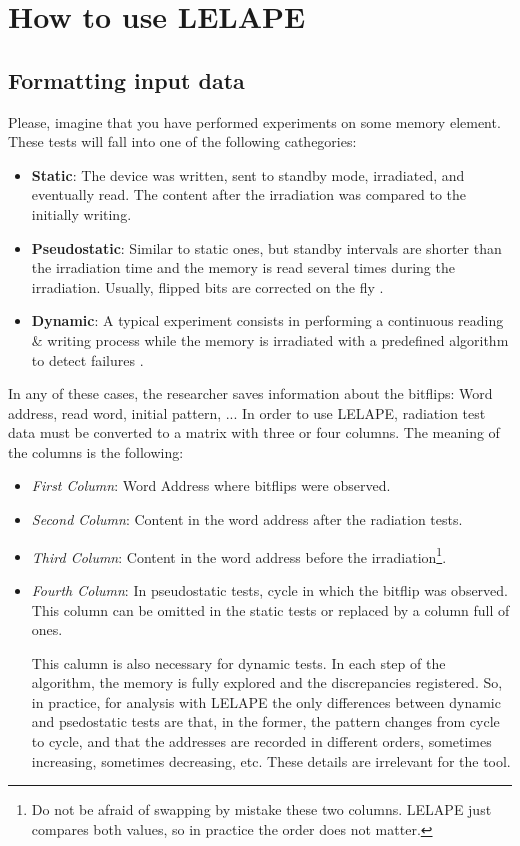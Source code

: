 \chapter{How to use LELAPE}
\section{Formatting input data}
%
Please, imagine that you have performed experiments on some memory element. These tests will fall into one of the following cathegories:
\begin{itemize}
	\item \textbf{Static}: The device was written, sent to standby mode, irradiated, and eventually read. The content after the irradiation was compared to the initially writing.
	\item \textbf{Pseudostatic}: Similar to static ones, but standby intervals are shorter than the irradiation time and the memory is read several times during the irradiation. Usually, flipped bits are corrected on the fly \cite{Gupta2017}.
	\item \textbf{Dynamic}: A typical experiment consists in performing a continuous reading \& writing process while the memory is irradiated with a predefined algorithm to detect failures \cite{Tsiligiannis2014a, Tsiligiannis2014b}. 
\end{itemize}

In any of these cases, the researcher saves information about the bitflips: Word address, read word, initial pattern, ... 
In order to use LELAPE, radiation test data must be converted to a matrix with three or four columns. The meaning of the columns is the following:
\begin{itemize}
	\item \textit{First Column}: Word Address where bitflips were observed.
	\item \textit{Second Column}: Content in the word address after the radiation tests.
	\item \textit{Third Column}: Content in the word address before the irradiation\footnote{Do not be afraid of swapping by mistake these two columns. LELAPE just compares both values, so in practice the order does not matter.}.
	\item \textit{Fourth Column}: In pseudostatic tests, cycle in which the bitflip was observed. This column can be omitted in the static tests or replaced by a column full of ones.  
	
	This calumn is also necessary for dynamic tests. In each step of the algorithm, the memory is fully explored and the discrepancies registered. So, in practice, for analysis with LELAPE the only differences between dynamic and psedostatic tests are that, in the former, the pattern changes from cycle to cycle, and that the addresses are recorded in different orders, sometimes increasing, sometimes decreasing, etc. These details are irrelevant for the tool.
\end{itemize} 

